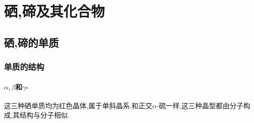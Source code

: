 \documentclass{ctexart}
\begin{document}
\section{硒,碲及其化合物}
\subsection{硒,碲的单质}
\subsubsection{单质的结构}
\paragraph{$\alpha,\beta$和$\gamma$-}
这三种硒单质均为红色晶体,属于单斜晶系.和正交$\alpha$-硫一样,这三种晶型都由分子构成,其结构与分子相似.
\end{document}
